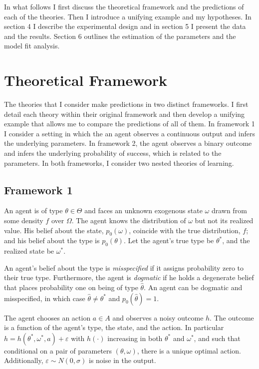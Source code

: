 \documentclass[
  12pt,
]{article}
\begin{document}
In what follows I first discuss the theoretical framework and the
predictions of each of the theories. Then I introduce a unifying example
and my hypotheses. In section 4 I describe the experimental design and
in section 5 I present the data and the results. Section 6 outlines the
estimation of the parameters and the model fit analysis.

\hypertarget{theoretical-framework}{%
\section{Theoretical Framework}\label{theoretical-framework}}

The theories that I consider make predictions in two distinct
frameworks. I first detail each theory within their original framework
and then develop a unifying example that allows me to compare the
predictions of all of them. In framework 1 I consider a setting in which
the an agent observes a continuous output and infers the underlying
parameters. In framework 2, the agent observes a binary outcome and
infers the underlying probability of success, which is related to the
parameters. In both frameworks, I consider two nested theories of
learning.

\hypertarget{framework-1}{%
\subsection{Framework 1}\label{framework-1}}

An agent is of type \(\theta \in \Theta\) and faces an unknown exogenous
state \(\omega\) drawn from some density \(f\) over \(\Omega\). The
agent knows the distribution of \(\omega\) but not its realized value.
His belief about the state, \(p_0(\omega)\), coincide with the true
distribution, \(f\); and his belief about the type is \(p_0(\theta)\).
Let the agent's true type be \(\theta^{*}\), and the realized state be
\(\omega^{*}\).

An agent's belief about the type is \emph{misspecified} if it assigns
probability zero to their true type. Furthermore, the agent is
\emph{dogmatic} if he holds a degenerate belief that places probability
one on being of type \(\hat{\theta}\). An agent can be dogmatic and
misspecified, in which case \(\hat{\theta} \neq \theta^*\) and
\(p_0(\hat{\theta}) = 1\).

The agent chooses an action \(a\in A\) and observes a noisy outcome
\(h\). The outcome is a function of the agent's type, the state, and the
action. In particular \(h = h(\theta^*, \omega^*, a) + \varepsilon\)
with \(h(\cdot)\) increasing in both \(\theta^*\) and \(\omega^*\), and
such that conditional on a pair of parameters \((\theta, \omega)\),
there is a unique optimal action. Additionally,
\(\varepsilon\sim N(0, \sigma)\) is noise in the output.
\end{document}
